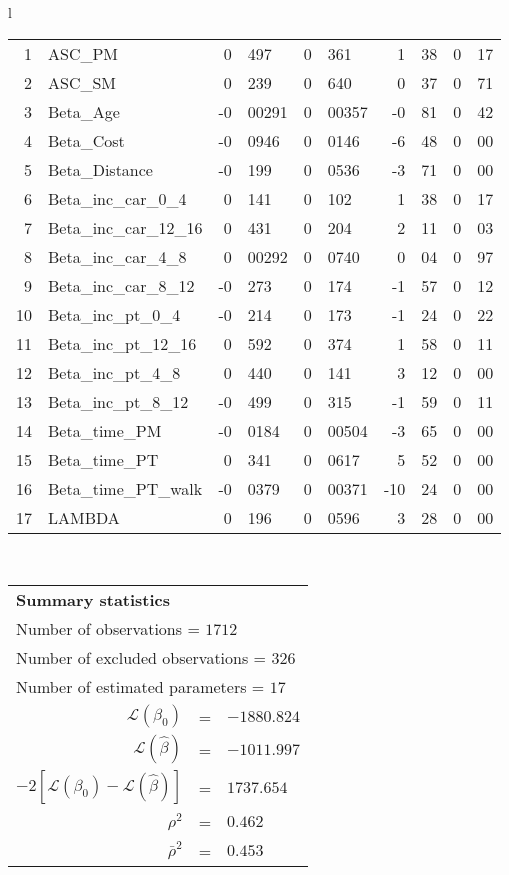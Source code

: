 \begin{tabular}{l}
\begin{tabular}{rlr@{.}lr@{.}lr@{.}lr@{.}l}
1 & ASC_PM  & 0&497 & 0&361 & 1&38 & 0&17\\
2 & ASC_SM & 0&239 & 0&640 & 0&37 & 0&71\\
3 & Beta_Age & -0&00291 & 0&00357 & -0&81 & 0&42\\
4 & Beta_Cost & -0&0946 & 0&0146 & -6&48 & 0&00\\
5 & Beta_Distance & -0&199 & 0&0536 & -3&71 & 0&00\\
6 & Beta_inc_car_0_4 & 0&141 & 0&102 & 1&38 & 0&17\\
7 & Beta_inc_car_12_16 & 0&431 & 0&204 & 2&11 & 0&03\\
8 & Beta_inc_car_4_8 & 0&00292 & 0&0740 & 0&04 & 0&97\\
9 & Beta_inc_car_8_12 & -0&273 & 0&174 & -1&57 & 0&12\\
10 & Beta_inc_pt_0_4 & -0&214 & 0&173 & -1&24 & 0&22\\
11 & Beta_inc_pt_12_16 & 0&592 & 0&374 & 1&58 & 0&11\\
12 & Beta_inc_pt_4_8 & 0&440 & 0&141 & 3&12 & 0&00\\
13 & Beta_inc_pt_8_12 & -0&499 & 0&315 & -1&59 & 0&11\\
14 & Beta_time_PM & -0&0184 & 0&00504 & -3&65 & 0&00\\
15 & Beta_time_PT & 0&341 & 0&0617 & 5&52 & 0&00\\
16 & Beta_time_PT_walk & -0&0379 & 0&00371 & -10&24 & 0&00\\
17 & LAMBDA & 0&196 & 0&0596 & 3&28 & 0&00\\
\hline
\end{tabular}
\\
\begin{tabular}{rcl}
\multicolumn{3}{l}{\bf Summary statistics}\\
\multicolumn{3}{l}{ Number of observations = $1712$} \\
\multicolumn{3}{l}{ Number of excluded observations = $326$} \\
\multicolumn{3}{l}{ Number of estimated  parameters = $17$} \\
 $\mathcal{L}(\beta_0)$ &=&  $-1880.824$ \\
 $\mathcal{L}(\hat{\beta})$ &=& $-1011.997 $  \\
 $-2[\mathcal{L}(\beta_0) -\mathcal{L}(\hat{\beta})]$ &=& $1737.654$ \\
    $\rho^2$ &=&   $0.462$ \\
    $\bar{\rho}^2$ &=&    $0.453$ \\
\end{tabular}
  \end{tabular}
